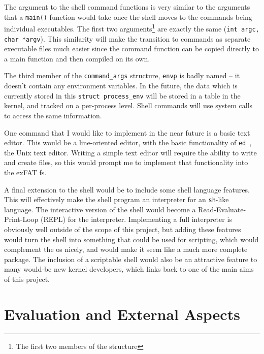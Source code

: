 \documentclass{article}
\begin{document}
The argument to the shell command functions is very similar to the arguments
that a \texttt{main()} function would take once the shell moves to the commands
being individual executables. The first two arguments\footnote{The first two
members of the structure} are exactly the same (\verb!int argc, char *argv!).
This similarity will make the transition to commands as separate executable
files much easier since the command function can be copied directly to a main
function and then compiled on its own.

The third member of the \verb!command_args! structure, \verb!envp! is badly
named -- it doesn't contain any environment variables. In the future, the data
which is currently stored in this \verb!struct process_env! will be stored in a
table in the kernel, and tracked on a per-process level. Shell commands will
use system calls to access the same information.

One command that I would like to implement in the near future is a basic text
editor. This would be a line-oriented editor, with the basic functionality of
\texttt{ed}~\cite{ed}, the Unix text editor. Writing a simple text editor will
require the ability to write and create files, so this would prompt me to
implement that functionality into the exFAT \gls{fs}.

A final extension to the shell would be to include some shell language
features. This will effectively make the shell program an interpreter for an
\texttt{sh}-like language. The interactive version of the shell would become a
Read-Evaluate-Print-Loop (REPL) for the interpreter. Implementing a full
interpreter is obviously well outside of the scope of this project, but adding
these features would turn the shell into something that could be used for
scripting, which would complement the \gls{os} nicely, and would make it seem
like a much more complete package. The inclusion of a scriptable shell would
also be an attractive feature to many would-be new kernel developers, which
links back to one of the main aims of this project.

\section{Evaluation and External Aspects}
\end{document}
